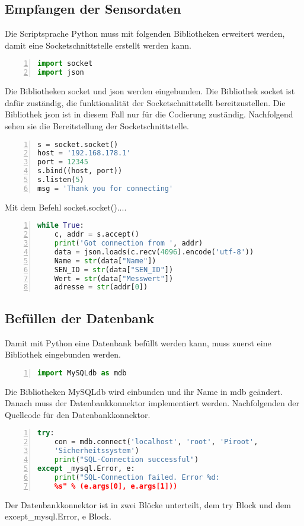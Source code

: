 \subsection{Empfangen der Sensordaten}
Die Scriptsprache Python muss mit folgenden Bibliotheken erweitert werden, damit eine Socketschnittstelle erstellt werden kann.
\begin{lstlisting}[caption=Einbinden der Bibliotheken für die Schnittstelle,frame=single,numbers=left,language=Python]
import socket
import json
\end{lstlisting}
Die Bibliotheken socket und json werden eingebunden. Die Bibliothek socket ist dafür zuständig, die funktionalität der Socketschnittstellt bereitzustellen. Die Bibliothek json ist in diesem Fall nur für die Codierung zuständig.\hfill
\noindent Nachfolgend sehen sie die Bereitstellung der Socketschnittstelle.
\begin{lstlisting}[caption=Bereitstellen der Socketschnittstelle,frame=single,numbers=left,language=Python]
s = socket.socket()
host = '192.168.178.1'
port = 12345
s.bind((host, port))
s.listen(5)
msg = 'Thank you for connecting'
\end{lstlisting}
Mit dem Befehl socket.socket()....

\begin{lstlisting}[caption=Speichern der Daten,frame=single,numbers=left,language=Python]
while True:
	c, addr = s.accept()
	print('Got connection from ', addr)
	data = json.loads(c.recv(4096).encode('utf-8'))
	Name = str(data["Name"])
	SEN_ID = str(data["SEN_ID"])
	Wert = str(data["Messwert"])
	adresse = str(addr[0])
\end{lstlisting}
\label{Daten}
\subsection{Befüllen der Datenbank}
Damit mit Python eine Datenbank befüllt werden kann, muss zuerst eine Bibliothek eingebunden werden.
\begin{lstlisting}[caption=Einbinden der Bibliothek für die Datenbank,frame=single,numbers=left,language=Python]
import MySQLdb as mdb
\end{lstlisting}
Die Bibliotheken MySQLdb wird einbunden und ihr Name in mdb geändert.\hfill
\noindent Danach muss der Datenbankkonnektor implementiert werden. Nachfolgenden der Quellcode für den Datenbankkonnektor.
\begin{lstlisting}[caption=Datenbankkonnekor,frame=single,numbers=left,language=Python]
try:
	con = mdb.connect('localhost', 'root', 'Piroot',
	'Sicherheitssystem')
	print("SQL-Connection successful")
except _mysql.Error, e:
	print("SQL-Connection failed. Error %d:
	%s" % (e.args[0], e.args[1]))
\end{lstlisting}
Der Datenbankkonnektor ist in zwei Blöcke unterteilt, dem try Block und dem except\_mysql.Error, e Block.


